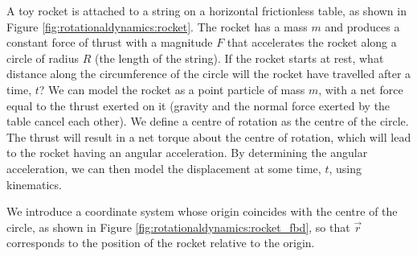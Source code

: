 \begin{example}{ A toy rocket is attached to a string on a horizontal frictionless table, as shown in Figure \ref{fig:rotationaldynamics:rocket}. The rocket has a mass $m$ and produces a constant force of thrust with a magnitude $F$ that accelerates the rocket along a circle of radius $R$ (the length of the string). If the rocket starts at rest, what distance along the circumference of the circle will the rocket have travelled after a time, $t$?}
We can model the rocket as a point particle of mass $m$, with a net force equal to the thrust exerted on it (gravity and the normal force exerted by the table cancel each other). We define a centre of rotation as the centre of the circle. The thrust will result in a net torque about the centre of rotation, which will lead to the rocket having an angular acceleration. By determining the angular acceleration, we can then model the displacement at some time, $t$, using kinematics.

We introduce a coordinate system whose origin coincides with the centre of the circle, as shown in Figure \ref{fig:rotationaldynamics:rocket_fbd}, so that $\vec r$ corresponds to the position of the rocket relative to the origin.


\end{example}
